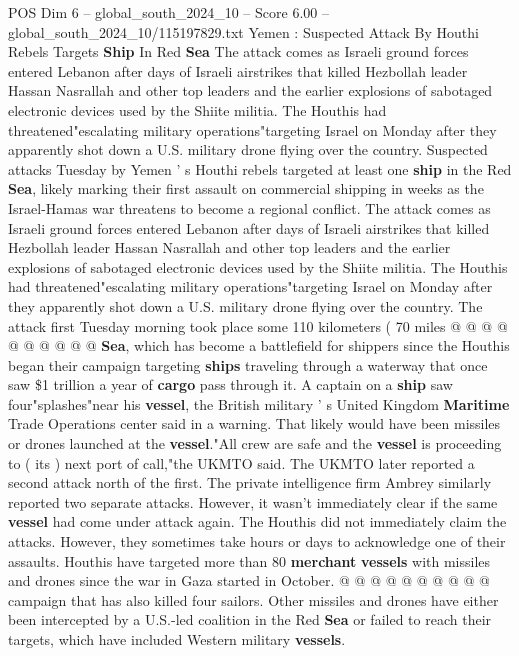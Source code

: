 \begin{textsample}{POS Dim 6 – global\_south\_2024\_10 – Score 6.00 – global\_south\_2024\_10/115197829.txt}  \label{ex:f6_pos_414}
Yemen : Suspected Attack By Houthi Rebels Targets \textbf{Ship} In Red \textbf{Sea} The attack comes as Israeli ground forces entered Lebanon after days of Israeli airstrikes that killed Hezbollah leader Hassan Nasrallah and other top leaders and the earlier explosions of sabotaged electronic devices used by the Shiite militia.
The Houthis had threatened"escalating military operations"targeting Israel on Monday after they apparently shot down a U.S. military drone flying over the country.
Suspected attacks Tuesday by Yemen ' s Houthi rebels targeted at least one \textbf{ship} in the Red \textbf{Sea}, likely marking their first assault on commercial shipping in weeks as the Israel-Hamas war threatens to become a regional conflict.
The attack comes as Israeli ground forces entered Lebanon after days of Israeli airstrikes that killed Hezbollah leader Hassan Nasrallah and other top leaders and the earlier explosions of sabotaged electronic devices used by the Shiite militia.
The Houthis had threatened"escalating military operations"targeting Israel on Monday after they apparently shot down a U.S. military drone flying over the country.
The attack first Tuesday morning took place some 110 kilometers ( 70 miles @ @ @ @ @ @ @ @ @ @ \textbf{Sea}, which has become a battlefield for shippers since the Houthis began their campaign targeting \textbf{ships} traveling through a waterway that once saw \$1 trillion a year of \textbf{cargo} pass through it.
A captain on a \textbf{ship} saw four"splashes"near his \textbf{vessel}, the British military ' s United Kingdom \textbf{Maritime} Trade Operations center said in a warning.
That likely would have been missiles or drones launched at the \textbf{vessel}."All crew are safe and the \textbf{vessel} is proceeding to ( its ) next port of call,"the UKMTO said.
The UKMTO later reported a second attack north of the first.
The private intelligence firm Ambrey similarly reported two separate attacks.
However, it wasn't immediately clear if the same \textbf{vessel} had come under attack again.
The Houthis did not immediately claim the attacks.
However, they sometimes take hours or days to acknowledge one of their assaults.
Houthis have targeted more than 80 \textbf{merchant} \textbf{vessels} with missiles and drones since the war in Gaza started in October. @ @ @ @ @ @ @ @ @ @ campaign that has also killed four sailors.
Other missiles and drones have either been intercepted by a U.S.-led coalition in the Red \textbf{Sea} or failed to reach their targets, which have included Western military \textbf{vessels}.

\end{textsample}
